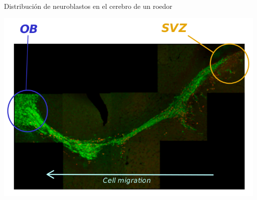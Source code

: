 \documentclass[
  unknownkeysallowed %
]{beamer}
\begin{document}
\begin{frame}{Distribución de neuroblastos en el cerebro de un roedor}
  \bigskip
  \begin{center}
    \includegraphics[width=0.9\linewidth]{img/neuroblastos-roedor-anotado}
  \end{center}
\end{frame}

\end{document}
